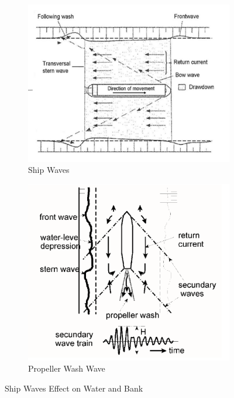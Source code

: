 \begin{figure}[H]
    \centering
    \begin{subfigure}{0.48\linewidth}
        \centering
        \includegraphics[width=\linewidth]{figures/ch2/shipwaves.png}
        \caption{Ship Waves}
        \label{fig:Ship Waves}
    \end{subfigure}
    \hfill
    \begin{subfigure}{0.48\linewidth}
        \centering
        \includegraphics[width=\linewidth]{figures/ch2/shipsecond.png}
        \caption{Propeller Wash Wave}
        \label{fig:Prop Wash Wave}
    \end{subfigure}
    \caption{Ship Waves Effect on Water and Bank}
    \label{Fig:Ship Waves Effect on Water and Bank}
\end{figure}



